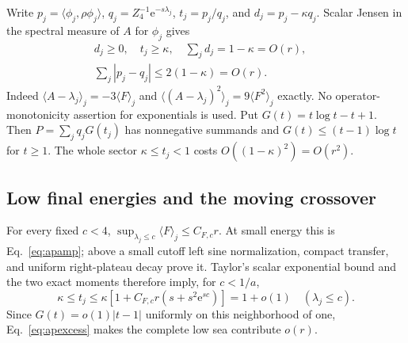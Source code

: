 \documentclass[aps,pra,reprint,superscriptaddress,longbibliography]{revtex4-2}
\newcommand{\ee}{\mathrm e}
\newcommand{\ip}[2]{\langle#1,#2\rangle}
\begin{document}
Write $p_j=\ip{\phi_j}{\rho\phi_j}$,
$q_j=Z_4^{-1}\ee^{-s\lambda_j}$, $t_j=p_j/q_j$, and
$d_j=p_j-\kappa q_j$. Scalar Jensen in the spectral measure of $A$
for $\phi_j$ gives
\begin{equation}
 \begin{gathered}
 d_j\ge0,\quad t_j\ge\kappa,\quad
 \sum_jd_j=1-\kappa=O(r),\quad\\
 \sum_j|p_j-q_j|\le2(1-\kappa)=O(r).
 \end{gathered}                                         \label{eq:apexcess}
\end{equation}
Indeed $\langle A-\lambda_j\rangle_j=-3\langle F\rangle_j$ and
$\langle(A-\lambda_j)^2\rangle_j=9\langle F^2\rangle_j$ exactly.
No operator-monotonicity assertion for exponentials is used. Put
$G(t)=t\log t-t+1$. Then $P=\sum_jq_jG(t_j)$ has nonnegative
summands and $G(t)\le(t-1)\log t$ for $t\ge1$. The whole sector
$\kappa\le t_j<1$ costs $O((1-\kappa)^2)=O(r^2)$.

\subsection{Low final energies and the moving crossover}

For every fixed $c<4$,
$\sup_{\lambda_j\le c}\langle F\rangle_j\le C_{F,c}r$.
At small energy this is Eq.~\eqref{eq:apamp}; above a small cutoff
left sine normalization, compact transfer, and uniform right-plateau
decay prove it. Taylor's scalar exponential bound and the two exact
moments therefore imply, for $c<1/a$,
\begin{equation}
 \kappa\le t_j\le\kappa[1+C_{F,c}r(s+s^2\ee^{sc})]=1+o(1)
                          \quad(\lambda_j\le c).          \label{eq:aplowentropy}
\end{equation}
Since $G(t)=o(1)|t-1|$ uniformly on this neighborhood of one,
Eq.~\eqref{eq:apexcess} makes the complete low sea contribute $o(r)$.
\end{document}
